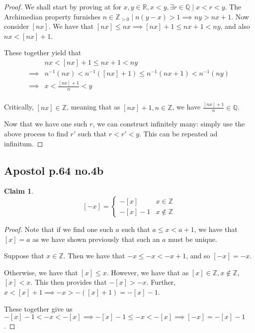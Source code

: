 \documentclass[12pt,letterpaper]{article}
\theoremstyle{definition}
\newtheorem*{claim}{Claim}
\newcommand{\R}{\mathbb{R}}
\newcommand{\Z}{\mathbb{Z}}
\newcommand{\Zg}{\mathbb{Z}_{>0}}
\newcommand{\Q}{\mathbb{Q}}
\begin{document}
\begin{proof}
  We shall start by proving at for $x,y \in \R, x < y, \exists r \in \Q \mid x <
  r < y$. The Archimedian property furnishes $n \in \Zg \mid n(y-x) > 1 \implies
  ny > nx + 1$. Now consider $[nx]$. We have that $[nx] \leq nx \implies [nx] +
  1 \leq nx + 1 < ny$, and also $nx < [nx] + 1$.

  These together yield that 
  \begin{align*}
    & nx < [nx] + 1 \leq nx + 1 < ny \\
    \implies& n^{-1}(nx) < n^{-1}([nx] +1) \leq n^{-1}(nx + 1) < n^{-1}(ny) \\
    \implies& x < \frac{[nx] + 1}{n} < y \\
  \end{align*}

  Critically, $[nx] \in \Z$, meaning that as $[nx] + 1, n \in \Z$, we have
  $\frac{[nx] + 1}{n} \in \Q$.

  Now that we have one such $r$, we can construct infinitely many: simply use
  the above process to find $r'$ such that $r < r' < y$. This can be repeated ad infinitum.
\end{proof}

\subsection*{Apostol p.64 no.4b}

\begin{claim}
  \[
    [-x] = \begin{cases}
      -[x] & x \in \Z \\
      -[x] - 1 & x \notin \Z
    \end{cases}
  \]
\end{claim}

\begin{proof}
  Note that if we find one such $a$ such that $a \leq x < a + 1$, we have that
  $[x] = a$ as we have shown previously that such an $a$ must be unique.

  Suppose that $x \in \Z$. Then we have that $-x \leq -x < -x + 1$, and so $[-x]
  = -x$.

  Otherwise, we have that $[x] \leq x$. However, we have that as $[x] \in \Z,
  x \notin \Z$, $[x] < x$. This then provides that $-[x] > -x$. Further, $x < [x]
  + 1 \implies -x > -([x] + 1) = -[x] - 1$.

  These together give us $-[x]-1<-x<-[x] \implies -[x] -1 \leq -x < -[x]
  \implies [-x] = -[x]-1$.
\end{proof}
\end{document}
